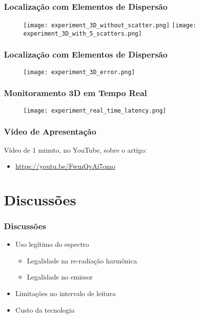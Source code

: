 \begin{frame}
  \frametitle{Localização com Elementos de Dispersão}

  \begin{figure}
          \centering
    \texttt{[image: experiment\_3D\_without\_scatter.png]}
                \vfill
    \texttt{[image: experiment\_3D\_with\_5\_scatters.png]}
        \end{figure}
\end{frame}

\begin{frame}
  \frametitle{Localização com Elementos de Dispersão}

  \begin{figure}
          \vfill
          \texttt{[image: experiment\_3D\_error.png]}
  \end{figure}
\end{frame}

\begin{frame}
  \frametitle{Monitoramento 3D em Tempo Real}

  \begin{figure}
          \vfill
          \texttt{[image: experiment\_real\_time\_latency.png]}
  \end{figure}
\end{frame}

\begin{frame}
  \frametitle{Vídeo de Apresentação}
    Vídeo de 1 minuto, no YouTube, sobre o artigo:
    \begin{itemize}
        \item \url{https://youtu.be/FwmQvAi7omo}
    \end{itemize}
\end{frame}

\section{Discussões}

\begin{frame}
  \frametitle{Discussões}

    \begin{itemize}
        \item Uso legítimo do espectro
            \begin{itemize}
                \item Legalidade na re-radiação harmônica
                \item Legalidade no emissor
            \end{itemize}
        \item Limitações no intervalo de leitura
        \item Custo da tecnologia
    \end{itemize}
\end{frame}

